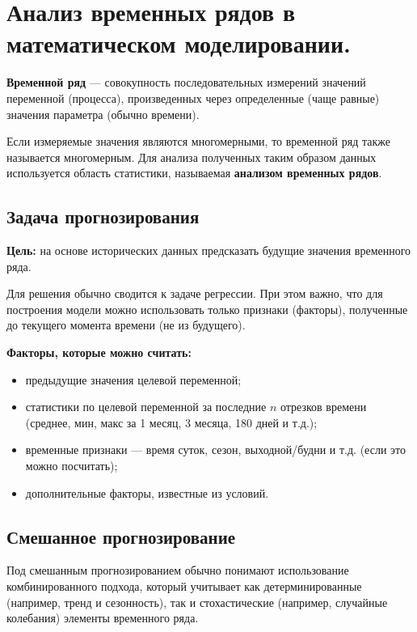 \section{Анализ временных рядов в математическом моделировании.}

\textbf{Временной ряд} — совокупность последовательных измерений значений переменной (процесса), произведенных через определенные (чаще равные) значения параметра (обычно времени).

Если измеряемые значения являются многомерными, то временной ряд также называется многомерным. Для анализа полученных таким образом данных используется область статистики, называемая \textbf{анализом временных рядов}.

\subsection*{Задача прогнозирования}

\textbf{Цель:} на основе исторических данных предсказать будущие значения временного ряда.

Для решения обычно сводится к задаче регрессии. При этом важно, что для построения модели можно использовать только признаки (факторы), полученные до текущего момента времени (не из будущего).

\textbf{Факторы, которые можно считать:}
\begin{itemize}
  \item предыдущие значения целевой переменной;
  \item статистики по целевой переменной за последние $n$ отрезков времени (среднее, мин, макс за 1 месяц, 3 месяца, 180 дней и т.д.);
  \item временные признаки — время суток, сезон, выходной/будни и т.д. (если это можно посчитать);
  \item дополнительные факторы, известные из условий.
\end{itemize}

\subsection*{Смешанное прогнозирование}

Под смешанным прогнозированием обычно понимают использование комбинированного подхода, который учитывает как детерминированные (например, тренд и сезонность), так и стохастические (например, случайные колебания) элементы временного ряда.

